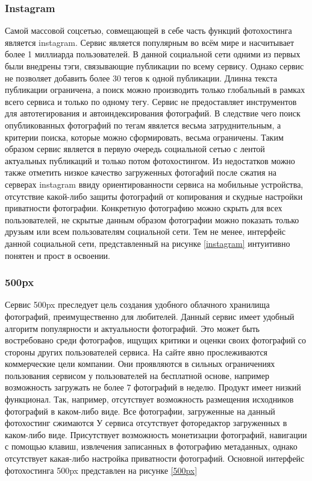 
\subsubsection{Instagram}
Самой массовой соцсетью, совмещающей в себе часть функций фотохостинга является instagram.
Сервис является популярным во всём мире и насчитывает более 1 миллиарда пользователей.
В данной социальной сети одними из первых были внедрены тэги, связывающие публикации по всему сервису.
Однако сервис не позволяет добавить более 30 тегов к одной публикации. 
Длинна текста публикации ограничена, а поиск можно производить только глобальный в рамках всего сервиса и только по одному тегу.
Сервис не предоставляет инструментов для автотегирования и автоиндексирования фотографий.
В следствие чего поиск опубликованных фотографий по тегам явялется весьма затруднительным, а критерии поиска, которые можно сформировать, весьма ограничены. 
Таким образом сервис является в первую очередь социальной сетью с лентой актуальных публикаций и только потом фотохостингом.
Из недостатков можно также отметить низкое качество загруженных фотогафий после сжатия на серверах instagram ввиду ориентированности сервиса на мобильные устройства, отсутствие какой-либо защиты фотографий от копирования и скудные настройки приватности фотографии.
Конкретную фотографию можно скрыть для всех пользователей, не скрытые данным образом фотографии можно показать только друзьям или всем пользователям социальной сети.
Тем не менее, интерфейс данной социальной сети, представленный на рисунке \ref{instagram} интуитивно понятен и прост в освоении.


\subsubsection{500px}
Сервис 500px преследует цель создания удобного облачного хранилища фотографий, преимущественно для любителей.
Данный сервис имеет удобный алгоритм популярности и актуальности фотографий.
Это может быть востребовано среди фотографов, ищущих критики и оценки своих фотографий со стороны других пользователей сервиса.
На сайте явно прослеживаются коммерческие цели компании.
Они проявляются в сильных ограничениях пользования сервисом у пользователей на бесплатной основе, например возможность загружать не более 7 фотографий в неделю.
Продукт имеет низкий функционал.
Так, например, отсутствует возможность размещения исходников фотографий в каком-либо виде.
Все фотографии, загруженные на данный фотохостинг сжимаются
У сервиса отсутствует фоторедактор загруженных в каком-либо виде.
Присутствует возможность монетизации фотографий, навигации с помощью клавиш, извлечения записанных в фотографию метаданных, однако отсутствует какая-либо настройка приватности фотографий.
Основной интерфейс фотохостинга 500px представлен на рисунке \ref{500px}


